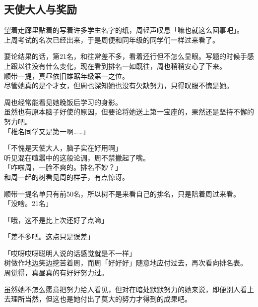 \subsection{天使大人与奖励}

望着走廊里贴着的写着许多学生名字的纸，周轻声叹息「嘛也就这么回事吧」。\\

上周考试的名次已经出来，于是周便和同年级的同学们一样过来看了。

要论结果的话，第21名，和往常差不多，看着还行但不怎么显眼。写题的时候手感上跟以往没有什么变化，现在看到排名一如既往，周也稍稍安心了下来。\\

顺带一提，真昼依旧雄踞年级第一之位。\\

尽管她真的是个才女，但周也深知她也没有欠缺努力，只得叹服不愧是她。

周也经常能看见她晚饭后学习的身影。\\

虽然也有原本脑子好使的原因，但要论将她送上第一宝座的，果然还是坚持不懈的努力吧。\\

「椎名同学又是第一啊……」

「不愧是天使大人，脑子实在好用啊」\\

听见混在喧嚣中的这般论调，周不禁撇起了嘴。\\

「咋啦周，一脸不爽的。排名不妙？」\\

和周一起的树看见周的样子，有点惊讶。

顺带一提名单只有前50名，所以树不是来看自己的排名，只是陪着周过来看。\\

「没啥。21名」

「哦，这不是比上次还好了点嘛」

「差不多吧。这点只是误差」

「哎呀哎呀聪明人说的话感觉就是不一样」\\

树做作地边笑边挖苦着周，而周「好好好」随意地应付过去，再次看向排名表。\\

周觉得，真昼真的有好好努力过。

虽然她不怎么愿意把努力给人看见，但对在暗处默默努力的她来说，即便别人看上去理所当然，但这也是她付出了莫大的努力才得到的成果吧。\\

